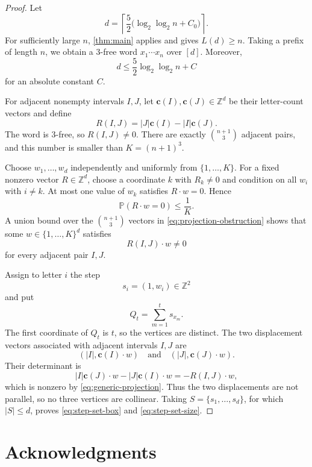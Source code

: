 \documentclass[11pt]{article}
\theoremstyle{plain}
\theoremstyle{definition}
\theoremstyle{remark}
\newcommand{\Z}{\mathbb Z}
\newcommand{\Prob}{\mathbb P}
\begin{document}
\begin{proof}
Let
\[
        d=\left\lceil \frac52\bigl(\log_2\log_2 n+C_0\bigr)\right\rceil.
\]
For sufficiently large \(n\), \cref{thm:main} applies and gives \(L(d)\ge n\). Taking a prefix of length \(n\), we obtain a 3-free word \(x_1\cdots x_n\) over \([d]\). Moreover,
\begin{equation}\label{eq:projection-dimension}
        d\le \frac{5}{2}\log_2\log_2 n+C
\end{equation}
for an absolute constant \(C\).

For adjacent nonempty intervals \(I,J\), let \(\mathbf c(I),\mathbf c(J)\in\Z^d\) be their letter-count vectors and define
\begin{equation}\label{eq:projection-obstruction}
        R(I,J)=|J|\mathbf c(I)-|I|\mathbf c(J).
\end{equation}
The word is 3-free, so \(R(I,J)\ne0\). There are exactly \(\binom{n+1}{3}\) adjacent pairs, and this number is smaller than \(K=(n+1)^3\).

Choose \(w_1,\ldots,w_d\) independently and uniformly from \(\{1,\ldots,K\}\). For a fixed nonzero vector \(R\in\Z^d\), choose a coordinate \(k\) with \(R_k\ne0\) and condition on all \(w_i\) with \(i\ne k\). At most one value of \(w_k\) satisfies \(R\cdot w=0\). Hence
\[
        \Prob(R\cdot w=0)\le\frac1K.
\]
A union bound over the \(\binom{n+1}{3}\) vectors in \eqref{eq:projection-obstruction} shows that some \(w\in\{1,\ldots,K\}^d\) satisfies
\begin{equation}\label{eq:generic-projection}
        R(I,J)\cdot w\ne0
\end{equation}
for every adjacent pair \(I,J\).

Assign to letter \(i\) the step
\[
        s_i=(1,w_i)\in\Z^2
\]
and put
\[
        Q_t=\sum_{m=1}^t s_{x_m}.
\]
The first coordinate of \(Q_t\) is \(t\), so the vertices are distinct. The two displacement vectors associated with adjacent intervals \(I,J\) are
\[
        (|I|,\mathbf c(I)\cdot w)
        \quad\text{and}\quad
        (|J|,\mathbf c(J)\cdot w).
\]
Their determinant is
\[
        |I|\mathbf c(J)\cdot w-|J|\mathbf c(I)\cdot w
        =-R(I,J)\cdot w,
\]
which is nonzero by \eqref{eq:generic-projection}. Thus the two displacements are not parallel, so no three vertices are collinear. Taking \(S=\{s_1,\ldots,s_d\}\), for which \(|S|\le d\), proves \eqref{eq:step-set-box} and \eqref{eq:step-set-size}.
\end{proof}

\section*{Acknowledgments}
\end{document}
